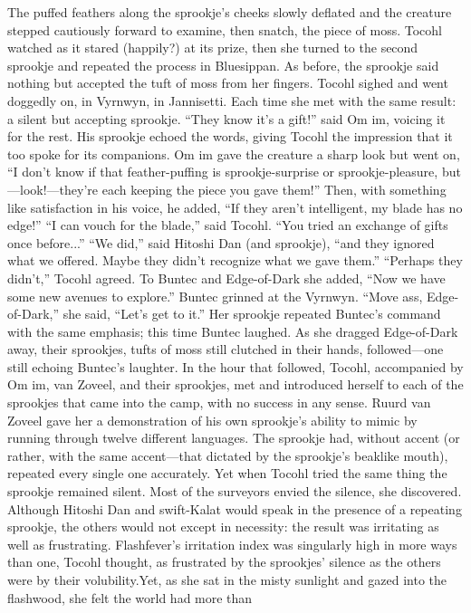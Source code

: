 \documentclass[9pt]{article}
\begin{document}
The puffed feathers along the sprookje’s cheeks slowly deflated and the creature stepped cautiously
forward to examine, then snatch, the piece of moss.
Tocohl watched as it stared (happily?) at its prize, then she turned to the second sprookje and
repeated the process in Bluesippan. As before, the sprookje said nothing but accepted the tuft of moss
from her fingers. Tocohl sighed and went doggedly on, in Vyrnwyn, in Jannisetti. Each time she met with
the same result: a silent but accepting sprookje.
“They know it’s a gift!” said Om im, voicing it for the rest. His sprookje echoed the words, giving
Tocohl the impression that it too spoke for its companions. Om im gave the creature a sharp look but
went on, “I don’t know if that feather-puffing is sprookje-surprise or sprookje-pleasure,
but—look!—they’re each keeping the piece you gave them!” Then, with something like satisfaction in his
voice, he added, “If they aren’t intelligent, my blade has no edge!”
“I can vouch for the blade,” said Tocohl. “You tried an exchange of gifts once before...”
“We did,” said Hitoshi Dan (and sprookje), “and they ignored what we offered. Maybe they didn’t
recognize what we gave them.”
“Perhaps they didn’t,” Tocohl agreed. To Buntec and Edge-of-Dark she added, “Now we have
some new avenues to explore.”
Buntec grinned at the Vyrnwyn. “Move ass, Edge-of-Dark,” she said, “Let’s get to it.” Her sprookje
repeated Buntec’s command with the same emphasis; this time Buntec laughed. As she dragged
Edge-of-Dark away, their sprookjes, tufts of moss still clutched in their hands, followed—one still
echoing Buntec’s laughter.
In the hour that followed, Tocohl, accompanied by Om im, van Zoveel, and their sprookjes, met and
introduced herself to each of the sprookjes that came into the camp, with no success in any sense. Ruurd
van Zoveel gave her a demonstration of his own sprookje’s ability to mimic by running through twelve
different languages. The sprookje had, without accent (or rather, with the same accent—that dictated by
the sprookje’s beaklike mouth), repeated every single one accurately. Yet when Tocohl tried the same
thing the sprookje remained silent.
Most of the surveyors envied the silence, she discovered. Although Hitoshi Dan and swift-Kalat
would speak in the presence of a repeating sprookje, the others would not except in necessity: the result
was irritating as well as frustrating. Flashfever’s irritation index was singularly high in more ways than one,
Tocohl thought, as frustrated by the sprookjes’ silence as the others were by their volubility.Yet, as she sat in the misty sunlight and gazed into the flashwood, she felt the world had more than
\end{document}
